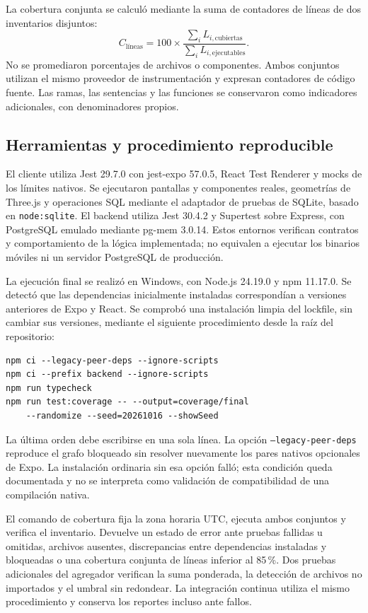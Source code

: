 La cobertura conjunta se calculó mediante la suma de contadores de líneas de dos inventarios disjuntos:
\[
C_{\mathrm{líneas}}=100\times
\frac{\sum_i L_{i,\mathrm{cubiertas}}}{\sum_i L_{i,\mathrm{ejecutables}}}.
\]
No se promediaron porcentajes de archivos o componentes. Ambos conjuntos utilizan el mismo proveedor de instrumentación y expresan contadores de código fuente. Las ramas, las sentencias y las funciones se conservaron como indicadores adicionales, con denominadores propios.

\subsection{Herramientas y procedimiento reproducible}

El cliente utiliza Jest 29.7.0 con jest-expo 57.0.5, React Test Renderer y mocks de los límites nativos. Se ejecutaron pantallas y componentes reales, geometrías de Three.js y operaciones SQL mediante el adaptador de pruebas de SQLite, basado en \texttt{node:sqlite}. El backend utiliza Jest 30.4.2 y Supertest sobre Express, con PostgreSQL emulado mediante pg-mem 3.0.14. Estos entornos verifican contratos y comportamiento de la lógica implementada; no equivalen a ejecutar los binarios móviles ni un servidor PostgreSQL de producción.

La ejecución final se realizó en Windows, con Node.js 24.19.0 y npm 11.17.0. Se detectó que las dependencias inicialmente instaladas correspondían a versiones anteriores de Expo y React. Se comprobó una instalación limpia del lockfile, sin cambiar sus versiones, mediante el siguiente procedimiento desde la raíz del repositorio:

\begin{verbatim}
npm ci --legacy-peer-deps --ignore-scripts
npm ci --prefix backend --ignore-scripts
npm run typecheck
npm run test:coverage -- --output=coverage/final 
    --randomize --seed=20261016 --showSeed
\end{verbatim}

La última orden debe escribirse en una sola línea. La opción \texttt{--legacy-peer-deps} reproduce el grafo bloqueado sin resolver nuevamente los pares nativos opcionales de Expo. La instalación ordinaria sin esa opción falló; esta condición queda documentada y no se interpreta como validación de compatibilidad de una compilación nativa.

El comando de cobertura fija la zona horaria UTC, ejecuta ambos conjuntos y verifica el inventario. Devuelve un estado de error ante pruebas fallidas u omitidas, archivos ausentes, discrepancias entre dependencias instaladas y bloqueadas o una cobertura conjunta de líneas inferior al 85\,\%. Dos pruebas adicionales del agregador verifican la suma ponderada, la detección de archivos no importados y el umbral sin redondear. La integración continua utiliza el mismo procedimiento y conserva los reportes incluso ante fallos.

